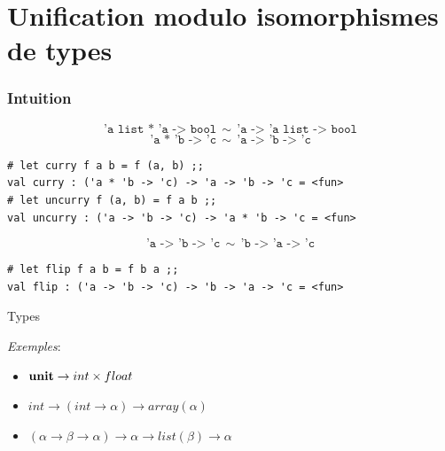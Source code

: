 \documentclass[serif]{beamer}
\newcommand{\exemples}{\textit{Exemples}\xspace}
\newcommand{\unit}{\bold{unit}}
\newcommand{\V}{\mathscr{V}}
\newcommand{\F}{\mathscr{F}}
\newcommand{\T}{\mathrm{T}}
\begin{document}

\section{Unification modulo isomorphismes de types}


\begin{frame}[fragile=singleslide]\frametitle{Intuition}
\small
\[ \texttt{'a list * 'a -> bool}\ \ \sim\ \ \texttt{'a -> 'a list -> bool} \]
\smallskip
\[ \texttt{'a * 'b -> 'c}\ \ \sim\ \ \texttt{'a -> 'b -> 'c} \]
\begin{verbatim}
# let curry f a b = f (a, b) ;;
val curry : ('a * 'b -> 'c) -> 'a -> 'b -> 'c = <fun>
# let uncurry f (a, b) = f a b ;;
val uncurry : ('a -> 'b -> 'c) -> 'a * 'b -> 'c = <fun>
\end{verbatim}
\bigskip
\[ \texttt{'a -> 'b -> 'c} \ \ \sim\ \ \texttt{'b -> 'a -> 'c} \]
\begin{verbatim}
# let flip f a b = f b a ;;
val flip : ('a -> 'b -> 'c) -> 'b -> 'a -> 'c = <fun>
\end{verbatim}
\end{frame}


\begin{frame}{Types}
\exemples :
\begin{itemize}
	\item $\unit \rightarrow int \times float$
	\item $int \rightarrow (int \rightarrow \alpha) \rightarrow array (\alpha)$
	\item $(\alpha \rightarrow \beta \rightarrow \alpha) \rightarrow \alpha \rightarrow list (\beta) \rightarrow \alpha$
\end{itemize}
\end{frame}
\end{document}
